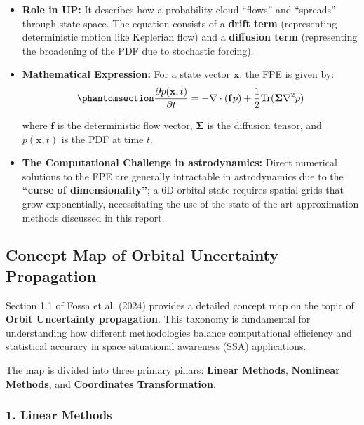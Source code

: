 \documentclass[
  letterpaper,
  DIV=11,
  numbers=noendperiod,
  oneside]{scrartcl}
\begin{document}
\begin{itemize}
\item
  \textbf{Role in UP:} It describes how a probability cloud ``flows''
  and ``spreads'' through state space. The equation consists of a
  \textbf{drift term} (representing deterministic motion like Keplerian
  flow) and a \textbf{diffusion term} (representing the broadening of
  the PDF due to stochastic forcing).
\item
  \textbf{Mathematical Expression:} For a state vector \(\mathbf{x}\),
  the FPE is given by:
  \begin{equation}\protect\phantomsection\label{eq-fokker-planck}{
  \frac{\partial p(\mathbf{x}, t)}{\partial t} = -\nabla \cdot (\mathbf{f} p) + \frac{1}{2} \text{Tr}(\mathbf{\Sigma} \nabla^2 p)
  }\end{equation}

  where \(\mathbf{f}\) is the deterministic flow vector,
  \(\mathbf{\Sigma}\) is the diffusion tensor, and \(p(\mathbf{x}, t)\)
  is the PDF at time \(t\).
\item
  \textbf{The Computational Challenge in astrodynamics:} Direct
  numerical solutions to the FPE are generally intractable in
  astrodynamics due to the \textbf{``curse of dimensionality''}; a 6D
  orbital state requires spatial grids that grow exponentially,
  necessitating the use of the state-of-the-art approximation methods
  discussed in this report.
\end{itemize}

\subsection{Concept Map of Orbital Uncertainty
Propagation}\label{concept-map-of-orbital-uncertainty-propagation}

Section 1.1 of Fossa et al. (2024) provides a detailed concept map on
the topic of \textbf{Orbit Uncertainty propagation}. This taxonomy is
fundamental for understanding how different methodologies balance
computational efficiency and statistical accuracy in space situational
awareness (SSA) applications.

The map is divided into three primary pillars: \textbf{Linear Methods},
\textbf{Nonlinear Methods}, and \textbf{Coordinates Transformation}.

\subsubsection{1. Linear Methods}\label{linear-methods}
\end{document}
